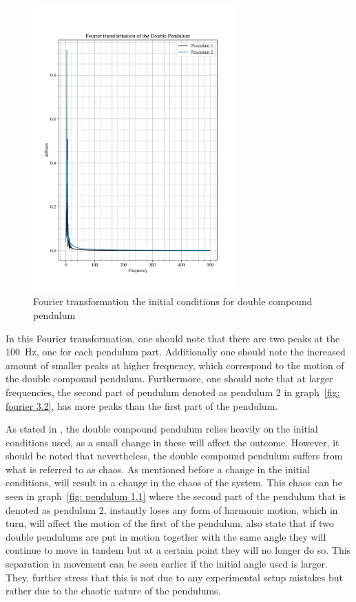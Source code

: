 \documentclass[12pt, a4paper]{article}
\begin{document}
\begin{figure}[H]
    \centering
    \includegraphics[width = 0.7\textwidth]{plots/Plot 3.2.png}\caption{Fourier transformation the initial conditions for double compound pendulum}\label{fig: fourier 2.2}
\end{figure}

In this Fourier transformation, one should note that there are two peaks at the \qty{100}{\hertz}, one for each pendulum part. Additionally one should note the increased amount of smaller peaks at higher frequency, which correspond to the motion of the double compound pendulum. Furthermore, one should note that at larger frequencies, the second part of pendulum denoted as pendulum 2 in graph~\ref{fig: fourier 3.2}, has more peaks than the first part of the pendulum. 

As stated in \cite{chaos}, the double compound pendulum relies heavily on the initial conditions used, as a small change in these will affect the outcome. However, it should be noted that nevertheless, the double compound pendulum suffers from what is referred to as chaos. As mentioned before a change in the initial conditions, will result in a change in the chaos of the system. This chaos can be seen in graph~\ref{fig: pendulum 1.1} where the second part of the pendulum that is denoted as pendulum 2, instantly loses any form of harmonic motion, which in turn, will affect the motion of the first of the pendulum. \cite{chaos} also state that if two double pendulums are put in motion together with the same angle they will continue to move in tandem but at a certain point they will no longer do so. This separation in movement can be seen earlier if the initial angle used is larger. They, further stress that this is not due to any experimental setup mistakes but rather due to the chaotic nature of the pendulums.
\end{document}
